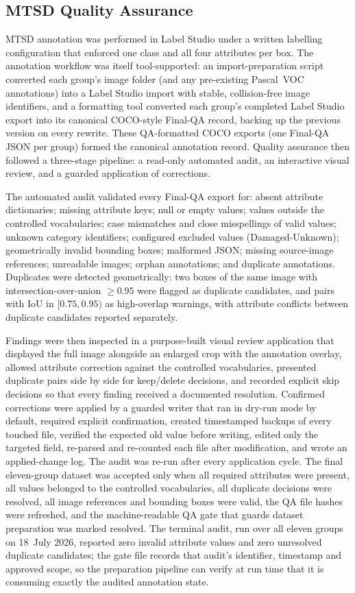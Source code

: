 \subsection{MTSD Quality Assurance}

MTSD annotation was performed in Label Studio under a written labelling configuration that enforced one class and all four attributes per box. The annotation workflow was itself tool-supported: an import-preparation script converted each group's image folder (and any pre-existing Pascal~VOC annotations) into a Label Studio import with stable, collision-free image identifiers, and a formatting tool converted each group's completed Label Studio export into its canonical COCO-style Final-QA record, backing up the previous version on every rewrite. These QA-formatted COCO exports (one Final-QA JSON per group) formed the canonical annotation record. Quality assurance then followed a three-stage pipeline: a read-only automated audit, an interactive visual review, and a guarded application of corrections.

The automated audit validated every Final-QA export for: absent attribute dictionaries; missing attribute keys; null or empty values; values outside the controlled vocabularies; case mismatches and close misspellings of valid values; unknown category identifiers; configured excluded values (Damaged-Unknown); geometrically invalid bounding boxes; malformed JSON; missing source-image references; unreadable images; orphan annotations; and duplicate annotations. Duplicates were detected geometrically: two boxes of the same image with intersection-over-union $\geq 0.95$ were flagged as duplicate candidates, and pairs with IoU in $[0.75, 0.95)$ as high-overlap warnings, with attribute conflicts between duplicate candidates reported separately.

Findings were then inspected in a purpose-built visual review application that displayed the full image alongside an enlarged crop with the annotation overlay, allowed attribute correction against the controlled vocabularies, presented duplicate pairs side by side for keep/delete decisions, and recorded explicit skip decisions so that every finding received a documented resolution. Confirmed corrections were applied by a guarded writer that ran in dry-run mode by default, required explicit confirmation, created timestamped backups of every touched file, verified the expected old value before writing, edited only the targeted field, re-parsed and re-counted each file after modification, and wrote an applied-change log. The audit was re-run after every application cycle. The final eleven-group dataset was accepted only when all required attributes were present, all values belonged to the controlled vocabularies, all duplicate decisions were resolved, all image references and bounding boxes were valid, the QA file hashes were refreshed, and the machine-readable QA gate that guards dataset preparation was marked resolved. The terminal audit, run over all eleven groups on 18~July 2026, reported zero invalid attribute values and zero unresolved duplicate candidates; the gate file records that audit's identifier, timestamp and approved scope, so the preparation pipeline can verify at run time that it is consuming exactly the audited annotation state.

